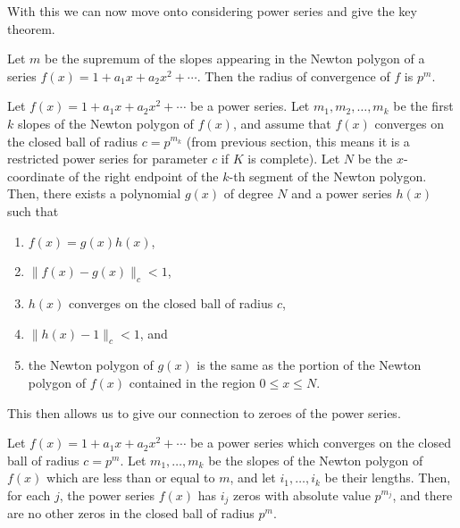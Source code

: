 With this we can now move onto considering power series and give the key theorem.

\begin{theorem} \label{RadofCon}
    Let $m$ be the supremum of the slopes appearing in the Newton polygon of a series
    $f(x) = 1 + a_1 x + a_2 x^2 + \cdots$. Then the radius of convergence of $f$ is $p^m.$
\end{theorem}

\begin{proposition}\label{NP}
    Let $f(x) = 1 + a_1 x + a_2 x^2 + \cdots$ be a power series. Let $m_1, m_2, \dots, m_k$ be the
    first $k$ slopes of the Newton polygon of $f(x)$, and assume that $f(x)$ converges on the
    closed ball of radius $c = p^{m_k}$ (from previous section, this means it is a restricted power
    series for parameter $c$ if $K$ is complete). Let $N$ be the $x$-coordinate of the right
    endpoint of the $k$-th segment of the Newton polygon. Then, there exists a polynomial
    $g(x)$ of degree $N$ and a power series $h(x)$ such that
    \begin{enumerate}
        \item $f(x) = g(x) h(x)$,
        \item $\| f(x) - g(x) \|_c < 1$,
        \item $h(x)$ converges on the closed ball of radius $c$,
        \item $\| h(x) - 1\|_c <1$, and
        \item the Newton polygon of $g(x)$ is the same as the portion of the Newton polygon of
        $f(x)$ contained in the region $0 \leq x \leq N$.
    \end{enumerate}
\end{proposition}

This then allows us to give our connection to zeroes of the power series.

\begin{corollary}
    Let $f(x) = 1 + a_1 x + a_2 x^2 + \cdots$ be a power series which converges on the closed ball
    of radius $c = p^m$. Let $m_1,\dots, m_k$ be the slopes of the Newton polygon of $f(x)$ which
    are less than or equal to $m$, and let $i_1,\dots,i_k$ be their lengths. Then, for each $j$, the
    power series $f(x)$ has $i_j$ zeros with absolute value $p^{m_j}$, and there are no other zeros
    in the closed ball of radius $p^m.$
\end{corollary}

